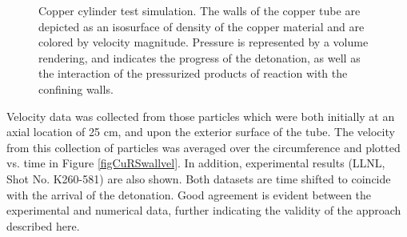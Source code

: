 \begin{figure}
  \center
  \caption{Copper cylinder test simulation.  The walls of the copper tube 
           are depicted as an isosurface of density of the copper material 
           and are colored by velocity magnitude.  Pressure is represented by a
           volume rendering, and indicates the progress of the detonation, as 
           well as the interaction of the pressurized products of reaction 
           with the confining walls. }
  \label{figCuRSiso}
\end{figure}

Velocity data was collected from those particles which were both initially 
at an axial location of 25 cm, and upon the exterior surface of the tube.  The 
velocity from this collection of particles was averaged over the circumference 
and plotted vs. time in Figure \ref{figCuRSwallvel}.  In addition, experimental 
results (LLNL, Shot No. K260-581) are also shown.  Both datasets are time 
shifted to coincide with the arrival of the detonation.  Good agreement is 
evident between the experimental and numerical data, further indicating the 
validity of the approach described here.

